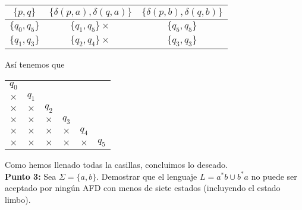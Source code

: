         \begin{center}
                \begin{tabular}{c||c|c}
                  $\{p,q\}$ & $\{\delta(p,a),\delta(q,a)\}$ & $\{\delta(p,b),\delta(q,b)\}$\\ \hline
                  $\{q_0,q_5\}$ & $\{q_1,q_5\}\times$ & $\{q_5,q_5\}$ \\ \hline
                  $\{q_1,q_3\}$ & $\{q_2,q_4\}\times$ & $\{q_3,q_3\}$ \\ \hline
                \end{tabular}
            \end{center}

        Así tenemos que
        \begin{center}
            \begin{tabular}{cccccc}
                $q_0$ \\ \cline{1-1}
                \multicolumn{1}{|c|}{$\times$} & $q_1$ \\ \cline{1-2}
                \multicolumn{1}{|c|}{$\times$} & \multicolumn{1}{|c|}{$\times$} & $q_2$ \\ \cline{1-3}
                \multicolumn{1}{|c|}{$\times$} & \multicolumn{1}{|c|}{$\times$}  & \multicolumn{1}{|c|}{$\times$} & $q_3$ \\ \cline{1-4} 
                \multicolumn{1}{|c|}{$\times$} & \multicolumn{1}{|c|}{$\times$} & \multicolumn{1}{|c|}{$\times$} & \multicolumn{1}{|c|}{$\times$} & $q_4$ \\ \cline{1-5}
                \multicolumn{1}{|c|}{$\times$} & \multicolumn{1}{|c|}{$\times$} & \multicolumn{1}{|c|}{$\times$} & \multicolumn{1}{|c|}{$\times$}  & \multicolumn{1}{|c|}{$\times$} & $q_5$ \\ \cline{1-5}         
            \end{tabular}
        \end{center}
    Como hemos llenado todas la casillas, concluimos lo deseado.\\

\textbf{Punto 3: } Sea $\Sigma=\{a,b\}.$ Demostrar que el lenguaje $L=a^*b\cup b^*a$ no puede ser aceptado por ningún AFD con menos de siete estados (incluyendo el estado limbo).\\

